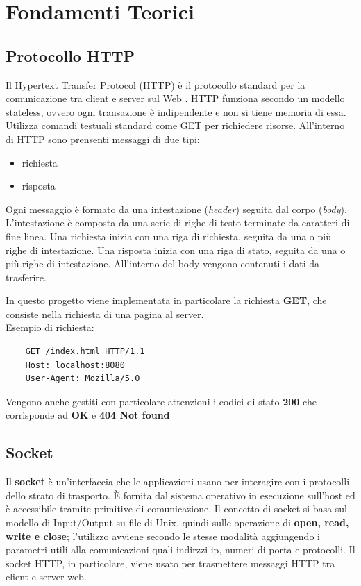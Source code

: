 \documentclass[a4paper,12pt]{report}
\begin{document}
\chapter{Fondamenti Teorici}
\section{Protocollo HTTP}
Il Hypertext Transfer Protocol (HTTP) è il protocollo standard per la comunicazione tra client e server sul Web . HTTP funziona secondo
un modello stateless, ovvero ogni transazione è indipendente e non si tiene memoria di essa. Utilizza comandi testuali standard come 
GET per richiedere risorse. All'interno di HTTP sono prensenti messaggi di due tipi:
\begin{itemize}
    \item richiesta
    \item risposta
\end{itemize}
Ogni messaggio è formato da una intestazione (\emph{header}) seguita dal corpo (\emph{body}). L'intestazione è composta da una serie di righe di testo
terminate da caratteri di fine linea. Una richiesta inizia con una riga di richiesta, seguita da una o più righe di intestazione. Una 
risposta inizia con una riga di stato, seguita da una o più righe di intestazione. All'interno del body vengono contenuti i dati da 
trasferire. 

In questo progetto viene implementata in particolare la richiesta \textbf{GET}, che consiste nella richiesta di una pagina al server. \\Esempio di 
richiesta:
\begin{verbatim}
    GET /index.html HTTP/1.1
    Host: localhost:8080
    User-Agent: Mozilla/5.0
\end{verbatim}
    
Vengono anche gestiti con particolare attenzioni i codici di stato \textbf{200} che corrisponde ad \textbf{OK} e \textbf{404 Not found}
\section{Socket}
Il \textbf{socket} è un'interfaccia che le applicazioni usano per interagire con i protocolli dello strato di trasporto. 
È fornita dal sistema operativo in esecuzione sull'host ed è accessibile tramite primitive di comunicazione. Il concetto di socket si basa
sul modello di Input/Output su file di Unix, quindi sulle operazione di \textbf{open, read, write e close}; l’utilizzo avviene secondo le stesse 
modalità aggiungendo i parametri utili alla comunicazioni quali indirzzi ip, numeri di porta e protocolli. 
Il socket HTTP, in particolare, viene usato per trasmettere messaggi HTTP tra client e server web.
\end{document}
